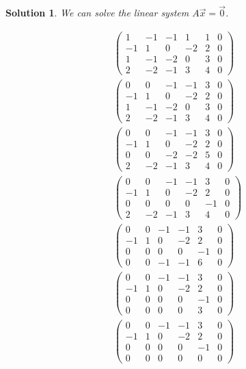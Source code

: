 \documentclass{article}
\newtheorem*{solution}{Solution}
\begin{document}
\begin{solution}
We can solve the linear system $A\vec{x} = \vec{0}$.

\begin{align*}
\left( \begin{array}{ccccc|c}1 & -1 & -1 & 1 & 1 & 0 \\ -1 & 1 & 0 & -2 & 2 & 0 \\ 1 & -1 & -2 & 0 & 3 & 0 \\ 2 & -2 & -1 & 3 & 4 & 0 \end{array} \right) \\
\left( \begin{array}{ccccc|c}0 & 0 & -1 & -1 & 3 & 0 \\ -1 & 1 & 0 & -2 & 2 & 0 \\ 1 & -1 & -2 & 0 & 3 & 0 \\ 2 & -2 & -1 & 3 & 4 & 0 \end{array} \right) \\
\left( \begin{array}{ccccc|c}0 & 0 & -1 & -1 & 3 & 0 \\ -1 & 1 & 0 & -2 & 2 & 0 \\ 0 & 0 & -2 & -2 & 5 & 0 \\ 2 & -2 & -1 & 3 & 4 & 0 \end{array} \right) \\
\left( \begin{array}{ccccc|c}0 & 0 & -1 & -1 & 3 & 0 \\ -1 & 1 & 0 & -2 & 2 & 0 \\ 0 & 0 & 0 & 0 & -1 & 0 \\ 2 & -2 & -1 & 3 & 4 & 0 \end{array} \right) \\
\left( \begin{array}{ccccc|c}0 & 0 & -1 & -1 & 3 & 0 \\ -1 & 1 & 0 & -2 & 2 & 0 \\ 0 & 0 & 0 & 0 & -1 & 0 \\ 0 & 0 & -1 & -1 & 6 & 0 \end{array} \right) \\
\left( \begin{array}{ccccc|c}0 & 0 & -1 & -1 & 3 & 0 \\ -1 & 1 & 0 & -2 & 2 & 0 \\ 0 & 0 & 0 & 0 & -1 & 0 \\ 0 & 0 & 0 & 0 & 3 & 0 \end{array} \right) \\
\left( \begin{array}{ccccc|c}0 & 0 & -1 & -1 & 3 & 0 \\ -1 & 1 & 0 & -2 & 2 & 0 \\ 0 & 0 & 0 & 0 & -1 & 0 \\ 0 & 0 & 0 & 0 & 0 & 0 \end{array} \right) \\

\end{align*}
\end{solution}
\end{document}
